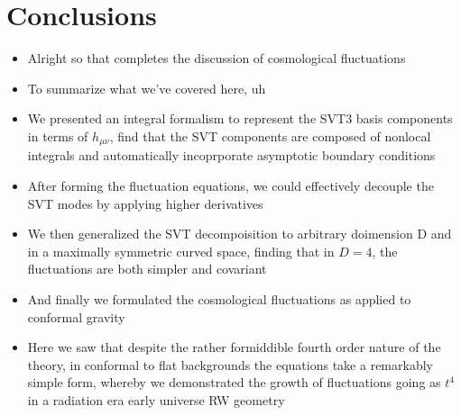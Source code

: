 \documentclass[10pt,letterpaper]{article}
\numberwithin{equation}{section}
\begin{document}
\section{Conclusions}
\begin{itemize}
	\item Alright so that completes the discussion of cosmological fluctuations
	\item To summarize what we've covered here, uh
	\item We presented an integral formalism to represent the SVT3 basis components in terms of $h_{\mu\nu}$, find that the SVT components are composed of nonlocal integrals and automatically incoprporate asymptotic boundary conditions
	\item After forming the fluctuation equations, we could effectively decouple the SVT modes by applying higher derivatives
	\item We then generalized the SVT decompoisition to arbitrary doimension D and in a maximally symmetric curved space, finding that in $D=4$, the fluctuations are both simpler and covariant
	\item And finally we formulated the cosmological fluctuations as applied to conformal gravity
	\item Here we saw that despite the rather formiddible fourth order nature of the theory, in conformal to flat backgrounds the equations take a remarkably simple form, whereby we demonstrated the growth of fluctuations going as $t^4$ in a radiation era early universe RW geometry
\end{itemize}

\end{document}
